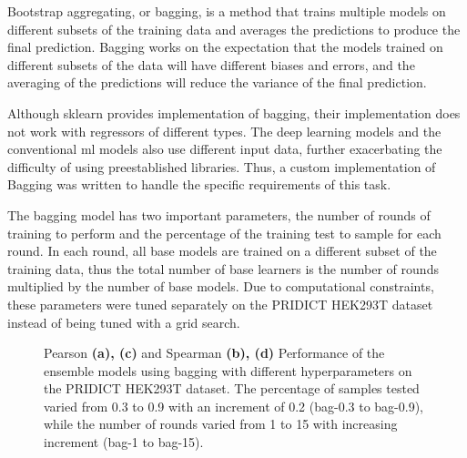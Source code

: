 Bootstrap aggregating, or bagging, is a method that trains multiple models on different subsets of the training data and averages the predictions to produce the final prediction. Bagging works on the expectation that the models trained on different subsets of the data will have different biases and errors, and the averaging of the predictions will reduce the variance of the final prediction\cite{dongSurveyEnsembleLearning2020}.

Although sklearn provides implementation of bagging, their implementation does not work with regressors of different types. The deep learning models and the conventional ml models also use different input data, further exacerbating the difficulty of using preestablished libraries. Thus, a custom implementation of Bagging was written to handle the specific requirements of this task.

The bagging model has two important parameters, the number of rounds of training to perform and the percentage of the training test to sample for each round. In each round, all base models are trained on a different subset of the training data, thus the total number of base learners is the number of rounds multiplied by the number of base models. Due to computational constraints, these parameters were tuned separately on the PRIDICT HEK293T dataset instead of being tuned with a grid search. 

\begin{figure}
    \centering
    \caption[Ensemble Model Performance]{Pearson \textbf{(a), (c)} and Spearman \textbf{(b), (d)} Performance of the ensemble models using bagging with different hyperparameters on the PRIDICT HEK293T dataset. The percentage of samples tested varied from 0.3 to 0.9 with an increment of 0.2 (bag-0.3 to bag-0.9), while the number of rounds varied from 1 to 15 with increasing increment (bag-1 to bag-15). }
    \label{fig:ensemble-bagging-tuning}
\end{figure}

